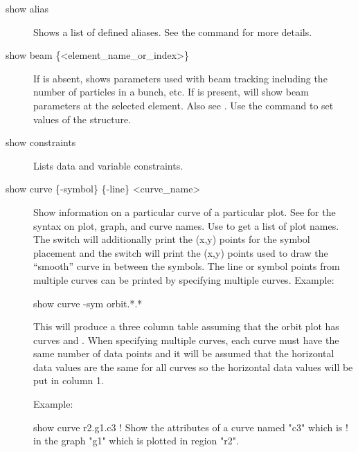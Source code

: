 {{{%

\begin{description}

\item[show alias] \Newline
Shows a list of defined aliases. See the  command for more
details.


\item[show beam \{<element\_name\_or\_index>\}] \Newline

If  is absent,  shows
parameters used with beam tracking including the number of particles
in a bunch, etc.  If  is present,  will show beam parameters at the selected element. Also see
.  Use the  command to set values
of the  structure.


\item[show constraints] \Newline
Lists data and variable constraints.


\item[show curve \{-symbol\} \{-line\} <curve\_name>] \Newline
Show information on a particular curve of a particular plot. See
 for the syntax on plot, graph, and curve names.  Use
 to get a list of plot names. The  switch
will additionally print the (x,y) points for the symbol placement and
the  switch will print the (x,y) points used to draw the
``smooth'' curve in between the symbols. The line or symbol points
from multiple curves can be printed by specifying multiple curves. Example:
\begin{example}
  show curve -sym orbit.*.*
\end{example}
This will produce a three column table assuming that the orbit plot
has curves  and . When specifying
multiple curves, each curve must have the same number of data points
and it will be assumed that the horizontal data values are the same
for all curves so the horizontal data values will be put in column 1.

Example:
\begin{example}
  show curve r2.g1.c3     ! Show the attributes of a curve named "c3" which is 
                          !   in the graph "g1" which is plotted in region "r2".
\end{example}


\end{description}}}}
